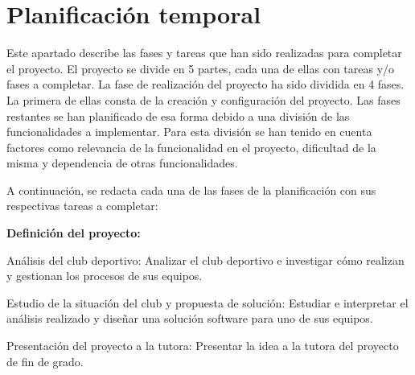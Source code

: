 \section{Planificación temporal}

Este apartado describe las fases y tareas que han sido realizadas para completar el proyecto. El proyecto se divide en 5 partes, cada una de ellas con tareas y/o fases a completar. La fase de realización del proyecto ha sido dividida en 4 fases. La primera de ellas consta de la creación y configuración del proyecto. Las fases restantes se han planificado de esa forma debido a una división de las funcionalidades a implementar. Para esta división se han tenido en cuenta factores como relevancia de la funcionalidad en el proyecto, dificultad de la misma y dependencia de otras funcionalidades.

A continuación, se redacta cada una de las fases de la planificación con sus respectivas tareas a completar:

\textbf{Definición del proyecto:}

\begin{description}[
    labelindent=2em,
    leftmargin=!,
    labelwidth=1.5cm,
    labelsep=1em,
    font=\normalfont]

  \item[TFD-1.] Análisis del club deportivo: Analizar el club deportivo e investigar cómo realizan y gestionan los procesos de sus equipos.
  \item[TFD-2.] Estudio de la situación del club y propuesta de solución: Estudiar e interpretar el análisis realizado y diseñar una solución software para uno de sus equipos.
  \item[TFD-3.] Presentación del proyecto a la tutora: Presentar la idea a la tutora del proyecto de fin de grado.
\end{description}

